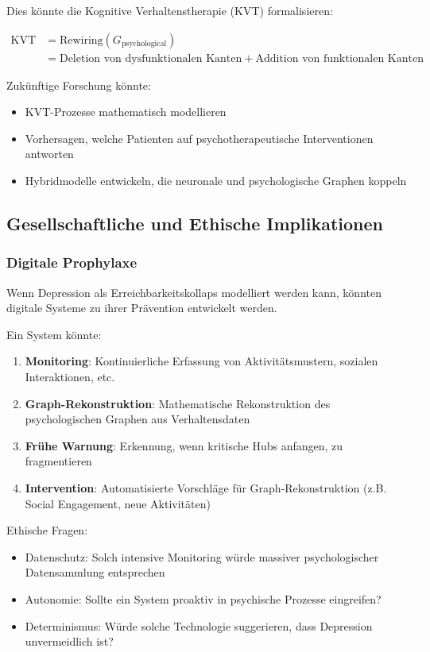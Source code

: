 \documentclass[a4paper,12pt]{article}
\theoremstyle{definition}
\begin{document}
Dies könnte die Kognitive Verhaltenstherapie (KVT) formalisieren:

\begin{align}
\text{KVT} &= \text{Rewiring}(G_{\text{psychological}}) \\
&= \text{Deletion von dysfunktionalen Kanten} + \text{Addition von funktionalen Kanten}
\end{align}

Zukünftige Forschung könnte:
\begin{itemize}
	\item KVT-Prozesse mathematisch modellieren
	\item Vorhersagen, welche Patienten auf psychotherapeutische Interventionen antworten
	\item Hybridmodelle entwickeln, die neuronale und psychologische Graphen koppeln
\end{itemize}

\subsection{Gesellschaftliche und Ethische Implikationen}

\subsubsection{Digitale Prophylaxe}

Wenn Depression als Erreichbarkeitskollaps modelliert werden kann, könnten digitale Systeme zu ihrer Prävention entwickelt werden.

Ein System könnte:

\begin{enumerate}
	\item \textbf{Monitoring}: Kontinuierliche Erfassung von Aktivitätsmustern, sozialen Interaktionen, etc.
	\item \textbf{Graph-Rekonstruktion}: Mathematische Rekonstruktion des psychologischen Graphen aus Verhaltensdaten
	\item \textbf{Frühe Warnung}: Erkennung, wenn kritische Hubs anfangen, zu fragmentieren
	\item \textbf{Intervention}: Automatisierte Vorschläge für Graph-Rekonstruktion (z.B. Social Engagement, neue Aktivitäten)
\end{enumerate}

Ethische Fragen:
\begin{itemize}
	\item Datenschutz: Solch intensive Monitoring würde massiver psychologischer Datensammlung entsprechen
	\item Autonomie: Sollte ein System proaktiv in psychische Prozesse eingreifen?
	\item Determinismus: Würde solche Technologie suggerieren, dass Depression unvermeidlich ist?
\end{itemize}
\end{document}
